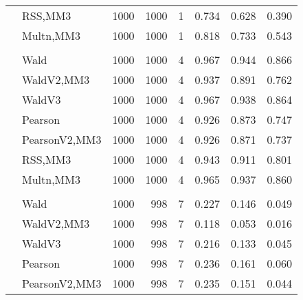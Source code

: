 \documentclass[
]{article}
\begin{document}
\begin{table}[H]
{\begin{tabular}[t]{llrrrrrr}
\hspace{1em} & RSS,MM3 & 1000 & 1000 & 1 & 0.734 & 0.628 & 0.390\\

\hspace{1em} & Multn,MM3 & 1000 & 1000 & 1 & 0.818 & 0.733 & 0.543\\
\cmidrule{1-8}
\addlinespace[0.3em]
\multicolumn{8}{l}{\textbf{1F 15V}}\\
\hspace{1em} & Wald & 1000 & 1000 & 4 & 0.967 & 0.944 & 0.866\\

\hspace{1em} & WaldV2,MM3 & 1000 & 1000 & 4 & 0.937 & 0.891 & 0.762\\

\hspace{1em} & WaldV3 & 1000 & 1000 & 4 & 0.967 & 0.938 & 0.864\\

\hspace{1em} & Pearson & 1000 & 1000 & 4 & 0.926 & 0.873 & 0.747\\

\hspace{1em} & PearsonV2,MM3 & 1000 & 1000 & 4 & 0.926 & 0.871 & 0.737\\

\hspace{1em} & RSS,MM3 & 1000 & 1000 & 4 & 0.943 & 0.911 & 0.801\\

\hspace{1em} & Multn,MM3 & 1000 & 1000 & 4 & 0.965 & 0.937 & 0.860\\
\cmidrule{1-8}
\addlinespace[0.3em]
\multicolumn{8}{l}{\textbf{2F 10V}}\\
\hspace{1em} & Wald & 1000 & 998 & 7 & 0.227 & 0.146 & 0.049\\

\hspace{1em} & WaldV2,MM3 & 1000 & 998 & 7 & 0.118 & 0.053 & 0.016\\

\hspace{1em} & WaldV3 & 1000 & 998 & 7 & 0.216 & 0.133 & 0.045\\

\hspace{1em} & Pearson & 1000 & 998 & 7 & 0.236 & 0.161 & 0.060\\

\hspace{1em} & PearsonV2,MM3 & 1000 & 998 & 7 & 0.235 & 0.151 & 0.044\\


\end{tabular}}
\end{table}
\end{document}
